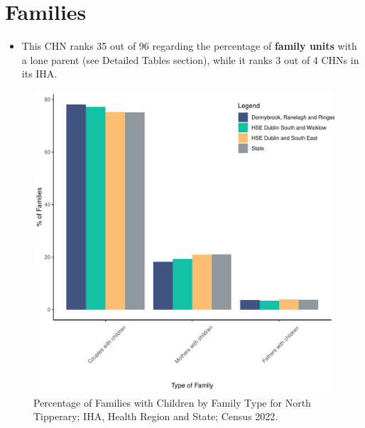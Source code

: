 \documentclass{article}
\begin{document}
\section{Families}\label{sect:Fam}
\begin{itemize}
\item This CHN ranks  35 out of 96 regarding the percentage of \textbf{family units} with a lone parent (see Detailed Tables section), while it ranks   3 out of 4 CHNs in its IHA.
\end{itemize}
\begin{figure}[H]
	\centering
	\includegraphics[width = 150mm]{../figures/FamED.pdf}
	\caption{Percentage of Families with Children by Family Type for North Tipperary; IHA, Health Region and State; Census 2022.}
	\label{fig:vbnv}
	\end{figure}
	
\end{document}
